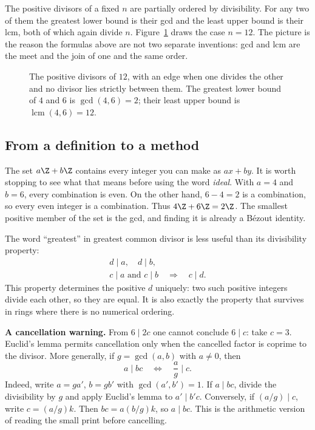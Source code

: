The positive divisors of a fixed $n$ are partially ordered by divisibility. For any two of them the greatest lower bound is their gcd and the least upper bound is their lcm, both of which again divide $n$. Figure~\ref{fig:divisor-lattice} draws the case $n=12$. The picture is the reason the formulas above are not two separate inventions: gcd and lcm are the meet and the join of one and the same order.

\begin{figure}[ht]
\centering
{}
\caption{The positive divisors of $12$, with an edge when one divides the other and no divisor lies strictly between them. The greatest lower bound of $4$ and $6$ is $\gcd(4,6)=2$; their least upper bound is $\operatorname{lcm}(4,6)=12$.}
\label{fig:divisor-lattice}
\end{figure}

\subsection*{From a definition to a method}
The set $a\Z+b\Z$ contains every integer you can make as $ax+by$. It is worth stopping to see what that means before using the word \emph{ideal}. With $a=4$ and $b=6$, every combination is even. On the other hand, $6-4=2$ is a combination, so every even integer is a combination. Thus $4\Z+6\Z=2\Z$. The smallest positive member of the set is the gcd, and finding it is already a B\'ezout identity.

The word ``greatest'' in greatest common divisor is less useful than its divisibility property:
\[
\begin{gathered}
d\mid a,\quad d\mid b,\\
c\mid a\text{ and }c\mid b\quad\Longrightarrow\quad c\mid d.
\end{gathered}
\]
This property determines the positive $d$ uniquely: two such positive integers divide each other, so they are equal. It is also exactly the property that survives in rings where there is no numerical ordering.

\textbf{A cancellation warning.} From $6\mid2c$ one cannot conclude $6\mid c$: take $c=3$. Euclid's lemma permits cancellation only when the cancelled factor is coprime to the divisor. More generally, if $g=\gcd(a,b)$ with $a\ne0$, then
\[
a\mid bc\quad\Longleftrightarrow\quad \frac ag\mid c.
\]
Indeed, write $a=ga'$, $b=gb'$ with $\gcd(a',b')=1$. If $a\mid bc$, divide the divisibility by $g$ and apply Euclid's lemma to $a'\mid b'c$. Conversely, if $(a/g)\mid c$, write $c=(a/g)k$. Then $bc=a(b/g)k$, so $a\mid bc$. This is the arithmetic version of reading the small print before cancelling.


